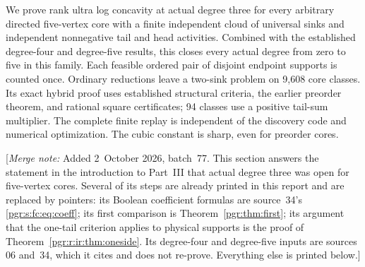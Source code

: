 \documentclass[11pt]{article}
\numberwithin{equation}{section}
\theoremstyle{definition}\newtheorem{definition}[theorem]{Definition}\newtheorem{remark}[theorem]{Remark}
\newcommand{\mnote}[1]{[\textit{Merge note:} #1]}
\begin{document}
We prove rank ultra log concavity at actual degree three for every arbitrary directed five-vertex core with a finite independent cloud of universal sinks and independent nonnegative tail and head activities. Combined with the established degree-four and degree-five results, this closes every actual degree from zero to five in this family. Each feasible ordered pair of disjoint endpoint supports is counted once. Ordinary reductions leave a two-sink problem on 9,608 core classes. Its exact hybrid proof uses established structural criteria, the earlier preorder theorem, and rational square certificates; 94 classes use a positive tail-sum multiplier. The complete finite replay is independent of the discovery code and numerical optimization. The cubic constant is sharp, even for preorder cores.

\mnote{Added 2~October 2026, batch~77. This section answers the statement
in the introduction to Part~III that actual degree three was open for
five-vertex cores. Several of its steps are already printed in this report
and are replaced by pointers: its Boolean coefficient formulas are
source~34's \eqref{pgr:s:fc:eq:coeff}; its first comparison is
Theorem~\ref{pgr:thm:first}; its argument that the one-tail criterion
applies to physical supports is the proof of
Theorem~\ref{pgr:r:ir:thm:oneside}. Its degree-four and degree-five inputs
are sources 06 and~34, which it cites and does not re-prove. Everything
else is printed below.}
\end{document}
